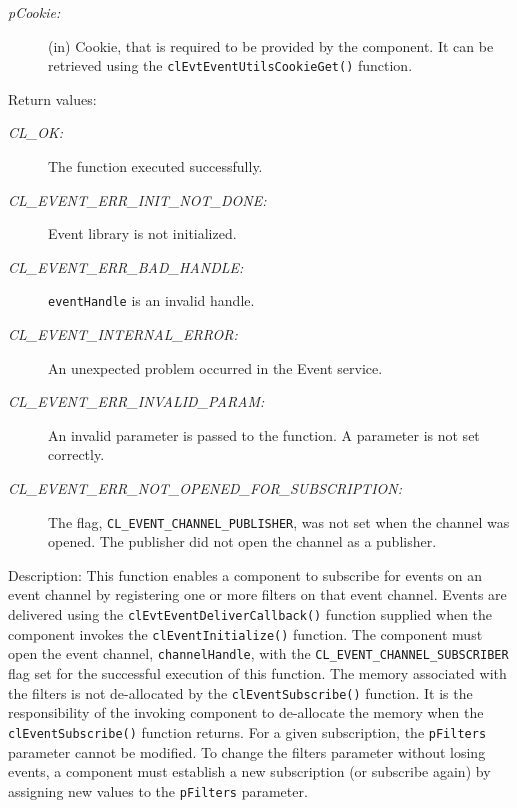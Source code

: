 \begin{flushleft}
\begin{Desc}
\begin{description}
\item[{\em p\-Cookie:}](in) Cookie, that is required to be provided by the component. It can be retrieved using the
{\tt{cl\-Evt\-Event\-Utils\-Cookie\-Get()}} function.

\end{description}
\end{Desc}
\begin{Desc}
\item[Return values:]
\begin{description}
\item[{\em CL\_\-OK:}]The function executed successfully. 
\item[{\em CL\_\-EVENT\_\-ERR\_\-INIT\_\-NOT\_\-DONE:}]Event library is not initialized. 
\item[{\em CL\_\-EVENT\_\-ERR\_\-BAD\_\-HANDLE:}]{\tt{eventHandle}} is an invalid handle.
\item[{\em CL\_\-EVENT\_\-INTERNAL\_\-ERROR:}]An unexpected problem occurred in the Event service. 
\item[{\em CL\_\-EVENT\_\-ERR\_\-INVALID\_\-PARAM:}]An invalid parameter is passed to the function. A parameter is not set correctly.
\item[{\em CL\_\-EVENT\_\-ERR\_\-NOT\_\-OPENED\_\-FOR\_\-SUBSCRIPTION:}]The flag, {\tt{CL\_\-EVENT\_\-CHANNEL\_\-PUBLISHER}}, was not set when the channel
was opened. The publisher did not open the channel as a publisher.
\end{description}
\end{Desc}
\begin{Desc}
\item[Description:]
This function enables a component to subscribe for events on an event channel by registering one
or more filters on that event channel. Events are delivered using the {\tt{clEvtEventDeliverCallback()}}
function supplied when the component invokes the {\tt{clEventInitialize()}} function.
The component must open the event channel, {\tt{channelHandle}}, with the {\tt{CL\_\-EVENT\_\-CHANNEL\_\-SUBSCRIBER}} flag set for the successful execution of
this function.
The memory associated with the filters is not de-allocated by the {\tt{clEventSubscribe()}} function.
It is the responsibility of the invoking component to de-allocate the memory when the {\tt{clEventSubscribe()}} function returns.
For a given subscription, the {\tt{pFilters}} parameter cannot be modified. To change the filters parameter without losing events, a component must 
establish a new subscription (or subscribe again) by assigning new values to the {\tt{pFilters}} parameter. 

\end{Desc}
\end{flushleft}
